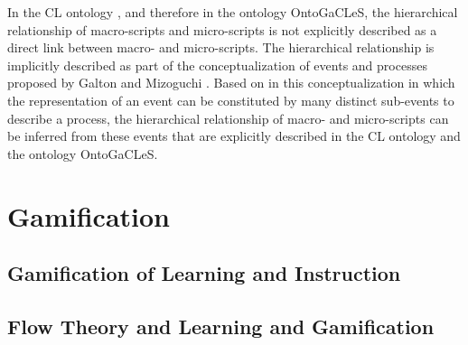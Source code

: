 In the CL ontology \cite{IsotaniInabaIkedaMizoguchi2009}, and therefore in the ontology OntoGaCLeS, the hierarchical relationship of macro-scripts and micro-scripts is not explicitly described as a direct link between macro- and micro-scripts. The hierarchical relationship is implicitly described as part of the conceptualization of events and processes proposed by Galton and Mizoguchi \cite{GaltonMizoguchi2009}. Based on in this conceptualization in which the representation of an event can be constituted by many distinct sub-events to describe a process, the hierarchical relationship of macro- and micro-scripts can be inferred from these events that are explicitly described in the CL ontology and the ontology OntoGaCLeS.

\section{Gamification}
\label{sec:gamification}

\subsection{Gamification of Learning and Instruction}


\subsection{Flow Theory and Learning and Gamification}





